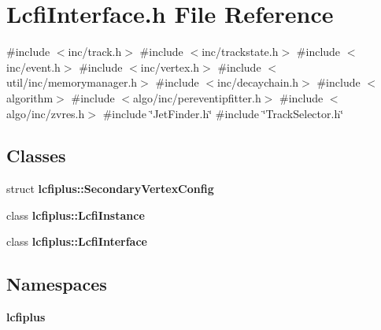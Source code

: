 \section{Lcfi\+Interface.\+h File Reference}
\label{LcfiInterface_8h}
{\ttfamily \#include $<$inc/track.\+h$>$}\newline
{\ttfamily \#include $<$inc/trackstate.\+h$>$}\newline
{\ttfamily \#include $<$inc/event.\+h$>$}\newline
{\ttfamily \#include $<$inc/vertex.\+h$>$}\newline
{\ttfamily \#include $<$util/inc/memorymanager.\+h$>$}\newline
{\ttfamily \#include $<$inc/decaychain.\+h$>$}\newline
{\ttfamily \#include $<$algorithm$>$}\newline
{\ttfamily \#include $<$algo/inc/pereventipfitter.\+h$>$}\newline
{\ttfamily \#include $<$algo/inc/zvres.\+h$>$}\newline
{\ttfamily \#include \char`\"{}Jet\+Finder.\+h\char`\"{}}\newline
{\ttfamily \#include \char`\"{}Track\+Selector.\+h\char`\"{}}\newline
\subsection*{Classes}
\begin{DoxyCompactItemize}
\item 
struct \textbf{ lcfiplus\+::\+Secondary\+Vertex\+Config}
\item 
class \textbf{ lcfiplus\+::\+Lcfi\+Instance}
\item 
class \textbf{ lcfiplus\+::\+Lcfi\+Interface}
\end{DoxyCompactItemize}
\subsection*{Namespaces}
\begin{DoxyCompactItemize}
\item 
 \textbf{ lcfiplus}
\end{DoxyCompactItemize}
